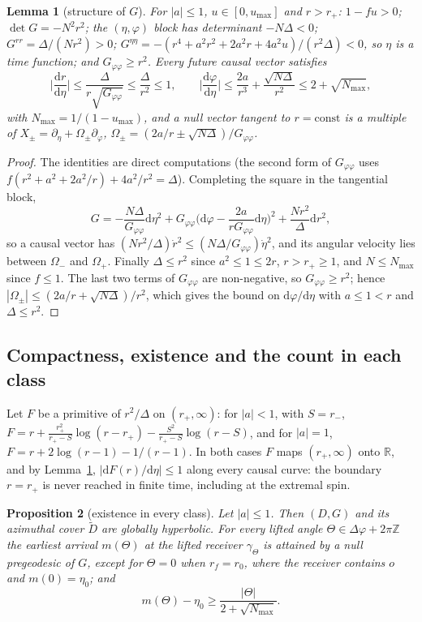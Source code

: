 \documentclass[aip,jmp,amsmath,amssymb,reprint]{revtex4-2}
\newcommand{\dd}{\mathrm{d}}
\theoremstyle{plain}
\newtheorem{proposition}{Proposition}[section]
\newtheorem{lemma}[proposition]{Lemma}
\theoremstyle{definition}
\begin{document}
\begin{lemma}[structure of $G$]\label{lem:kerr-G}
For $|a|\le1$, $u\in[0,u_{\max}]$ and $r>r_+$: $1-fu>0$; $\det G=-N^2r^2$; the $(\eta,\varphi)$ block has
determinant $-N\Delta<0$; $G^{rr}=\Delta/(Nr^2)>0$;
$G^{\eta\eta}=-(r^4+a^2r^2+2a^2r+4a^2u)/(r^2\Delta)<0$, so $\eta$ is a time function; and
$G_{\varphi\varphi}\ge r^2$. Every future causal vector satisfies
\[
  \Big|\frac{\dd r}{\dd\eta}\Big|\le\frac{\Delta}{r\sqrt{G_{\varphi\varphi}}}\le\frac\Delta{r^2}\le1,\qquad
  \Big|\frac{\dd\varphi}{\dd\eta}\Big|\le\frac{2a}{r^3}+\frac{\sqrt{N\Delta}}{r^2}\le2+\sqrt{N_{\max}},
\]
with $N_{\max}=1/(1-u_{\max})$, and a null vector tangent to $r=\mathrm{const}$ is a multiple of
$X_\pm=\partial_\eta+\Omega_\pm\partial_\varphi$, $\Omega_\pm=(2a/r\pm\sqrt{N\Delta})/G_{\varphi\varphi}$.
\end{lemma}

\begin{proof}
The identities are direct computations (the second form of $G_{\varphi\varphi}$ uses
$f(r^2+a^2+2a^2/r)+4a^2/r^2=\Delta$). Completing the square in the tangential block,
\[
  G=-\frac{N\Delta}{G_{\varphi\varphi}}\dd\eta^2+G_{\varphi\varphi}\Big(\dd\varphi-\frac{2a}{rG_{\varphi\varphi}}\dd\eta\Big)^2+\frac{Nr^2}\Delta\dd r^2,
\]
so a causal vector has $(Nr^2/\Delta)\dot r^2\le(N\Delta/G_{\varphi\varphi})\dot\eta^2$, and its angular velocity lies
between $\Omega_-$ and $\Omega_+$. Finally $\Delta\le r^2$ since $a^2\le1\le2r$, $r>r_+\ge1$, and
$N\le N_{\max}$ since $f\le1$. The last two terms of $G_{\varphi\varphi}$ are non-negative, so $G_{\varphi\varphi}\ge r^2$;
hence $|\Omega_\pm|\le(2a/r+\sqrt{N\Delta})/r^2$, which gives the bound on $\dd\varphi/\dd\eta$ with $a\le1<r$ and
$\Delta\le r^2$.
\end{proof}

\subsection{Compactness, existence and the count in each class}

Let $F$ be a primitive of $r^2/\Delta$ on $(r_+,\infty)$: for $|a|<1$, with $S=r_-$,
$F=r+\frac{r_+^2}{r_+-S}\log(r-r_+)-\frac{S^2}{r_+-S}\log(r-S)$, and for $|a|=1$,
$F=r+2\log(r-1)-1/(r-1)$. In both cases $F$ maps $(r_+,\infty)$ onto $\mathbb R$, and by
Lemma~\ref{lem:kerr-G}, $|\dd F(r)/\dd\eta|\le1$ along every causal curve: the boundary $r=r_+$ is never
reached in finite time, including at the extremal spin.

\begin{proposition}[existence in every class]\label{prop:kerr-exist}
Let $|a|\le1$. Then $(D,G)$ and its azimuthal cover $\tilde D$ are globally hyperbolic. For every lifted
angle $\Theta\in\Delta\varphi+2\pi\mathbb Z$ the earliest arrival $m(\Theta)$ at the lifted receiver $\gamma_\Theta$ is
attained by a null pregeodesic of $G$, except for $\Theta=0$ when $r_f=r_0$, where the receiver contains $o$ and
$m(0)=\eta_0$; and
\[
  m(\Theta)-\eta_0\ge\frac{|\Theta|}{2+\sqrt{N_{\max}}} .
\]
\end{proposition}
\end{document}
